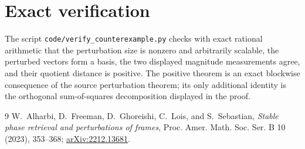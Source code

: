 \documentclass[11pt]{article}
\begin{document}
\section{Exact verification}

The script \texttt{code/verify\_counterexample.py} checks with exact rational
arithmetic that the perturbation size is nonzero and arbitrarily scalable,
the perturbed vectors form a basis, the two displayed magnitude measurements
agree, and their quotient distance is positive. The positive theorem is an
exact blockwise consequence of the source perturbation theorem; its only
additional identity is the orthogonal sum-of-squares decomposition displayed
in the proof.

\begin{thebibliography}{9}
W.~Alharbi, D.~Freeman, D.~Ghoreishi, C.~Lois, and S.~Sebastian,
\emph{Stable phase retrieval and perturbations of frames},
Proc. Amer. Math. Soc. Ser. B 10 (2023), 353--368;
\href{https://arxiv.org/abs/2212.13681}{arXiv:2212.13681}.
\end{thebibliography}
\end{document}

